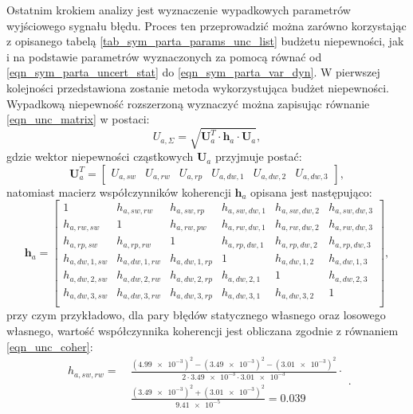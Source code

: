Ostatnim krokiem analizy jest wyznaczenie wypadkowych parametrów wyjściowego sygnału błędu. Proces ten przeprowadzić można zarówno korzystając z opisanego tabelą \ref{tab_sym_parta_params_unc_list} budżetu niepewności, jak i na podstawie parametrów wyznaczonych za pomocą równać od \eqref{eqn_sym_parta_uncert_stat} do \eqref{eqn_sym_parta_var_dyn}. W pierwszej kolejności przedstawiona zostanie metoda wykorzystująca budżet niepewności. Wypadkową niepewność rozszerzoną wyznaczyć można zapisując równanie \eqref{eqn_unc_matrix} w postaci:
\begin{equation}
U_{a,\Sigma} = \sqrt{\mathbf{U}_{a}^{T} \cdot \mathbf{h}_{a} \cdot \mathbf{U}_{a}} \label{eqn_sym_parta_uncert_sum},
\end{equation}
gdzie wektor niepewności cząstkowych $\mathbf{U}_{a}$ przyjmuje postać:
\begin{equation}
\mathbf{U}_{a}^{T} =
\begin{bmatrix}
U_{a,sw} & U_{a,rw} & U_{a,rp} & U_{a,dw,1} & U_{a,dw,2} & U_{a,dw,3}
\end{bmatrix}
\label{eqn_sym_parta_uncert_vector},
\end{equation}
natomiast macierz współczynników koherencji $\mathbf{h}_{a}$ opisana jest następująco:
\begin{equation}
\mathbf{h}_{a} =
\begin{bmatrix}
1             & h_{a,sw,rw}   & h_{a,sw,rp}   & h_{a,sw,dw,1} & h_{a,sw,dw,2} & h_{a,sw,dw,3} \\
h_{a,rw,sw}   & 1             & h_{a,rw,pw}   & h_{a,rw,dw,1} & h_{a,rw,dw,2} & h_{a,rw,dw,3} \\
h_{a,rp,sw}   & h_{a,rp,rw}   & 1             & h_{a,rp,dw,1} & h_{a,rp,dw,2} & h_{a,rp,dw,3} \\
h_{a,dw,1,sw} & h_{a,dw,1,rw} & h_{a,dw,1,rp} & 1             & h_{a,dw,1,2}  & h_{a,dw,1,3}  \\
h_{a,dw,2,sw} & h_{a,dw,2,rw} & h_{a,dw,2,rp} & h_{a,dw,2,1}  & 1             & h_{a,dw,2,3}  \\
h_{a,dw,3,sw} & h_{a,dw,3,rw} & h_{a,dw,3,rp} & h_{a,dw,3,1}  & h_{a,dw,3,2}  & 1             \\
\end{bmatrix}
\label{eqn_sym_parta_uncert_coher},
\end{equation}
przy czym przykładowo, dla pary błędów statycznego własnego oraz losowego własnego, wartość współczynnika koherencji jest obliczana zgodnie z równaniem \eqref{eqn_unc_coher}:
\begin{equation}
\begin{split}
h_{a,sw,rw} = ~
& \frac{ \left( \num{4.99e-3} \right)^{2} - \left( \num{3.49e-3} \right)^{2} - \left( \num{3.01e-3} \right)^{2}}{2 \cdot \num{3.49e-3} \cdot \num{3.01e-3}} \cdot \\
& \frac{ \left( \num{3.49e-3} \right)^{2} + \left( \num{3.01e-3} \right)^{2}}{\num{9.41e-5}} = 0.039
\end{split}
\label{eqn_sym_parta_coher_sw_rw}.
\end{equation}
